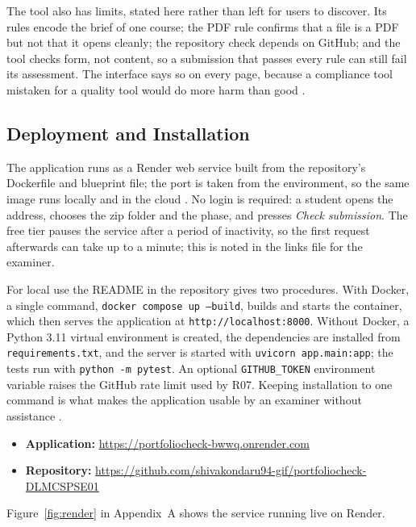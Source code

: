 \documentclass[a4paper,11pt]{article}
\begin{document}
The tool also has limits, stated here rather than left for users to discover.
Its rules encode the brief of one course; the PDF rule confirms that a file is a
PDF but not that it opens cleanly; the repository check depends on GitHub; and
the tool checks form, not content, so a submission that passes every rule can
still fail its assessment. The interface says so on every page, because a
compliance tool mistaken for a quality tool would do more harm than good
\citep{Messer2024}.

\subsection{Deployment and Installation}\label{sec:deployment}

The application runs as a Render web service built from the repository's
Dockerfile and blueprint file; the port is taken from the environment, so the
same image runs locally and in the cloud \citep{Render2025, Docker2024}. No login
is required: a student opens the address, chooses the zip folder and the phase,
and presses \textit{Check submission}. The free tier pauses the service after a
period of inactivity, so the first request afterwards can take up to a minute;
this is noted in the links file for the examiner.

For local use the README in the repository gives two procedures. With Docker, a
single command, \texttt{docker compose up --build}, builds and starts the
container, which then serves the application at \texttt{http://localhost:8000}.
Without Docker, a Python 3.11 virtual environment is created, the dependencies
are installed from \texttt{requirements.txt}, and the server is started with
\texttt{uvicorn app.main:app}; the tests run with \texttt{python -m pytest}. An
optional \texttt{GITHUB\_TOKEN} environment variable raises the GitHub rate limit
used by R07. Keeping installation to one command is what makes the application
usable by an examiner without assistance \citep{Kim2021}.

\begin{itemize}[itemsep=0pt]
\item \textbf{Application:} \url{https://portfoliocheck-bwwq.onrender.com}
\item \textbf{Repository:} \url{https://github.com/shivakondaru94-gif/portfoliocheck-DLMCSPSE01}
\end{itemize}

Figure~\ref{fig:render} in Appendix~A shows the service running live on
Render.
\end{document}
